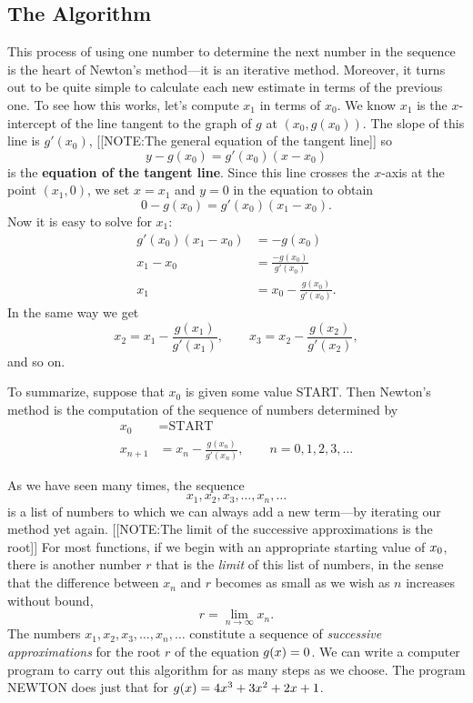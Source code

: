 \subsection{The Algorithm}
\label{subsec:the-algorithm}

This process of using one number to determine the next number in the
sequence is the heart of Newton's method---it is an iterative method.
Moreover, it turns out to be quite simple to calculate each new
estimate in terms of the previous one.  To see how this works, let's
compute $x_{1}$ in terms of $x_{0}$.  We know $x_{1}$ is the
$x$-intercept of the line tangent to the graph of $g$ at $(x_{0},
g(x_{0}))$.  The slope of this line is $g'(x_{0})$,
[[NOTE:The general equation of the tangent line]] 
so 
	\[
y - g(x_{0}) = g'(x_{0})(x - x_{0})
\] 
is the {\bf equation of the tangent line}.  Since this line crosses the $x$-axis at the point  $(x_{1},0)$,  we set  $x = x_{1}$  and  $y = 0$  in the equation to obtain
	\[
0 - g(x_{0}) = g'(x_{0})(x_{1} - x_{0}).
\]
Now it is easy to solve for  $x_{1}$:
\begin{align*}
     g'(x_{0})(x_{1} - x_{0}) &= -g(x_{0}) \\
                x_{1} - x_{0} &= \frac{-g(x_{0})}{g'(x_{0})}  \\
                        x_{1} &= x_{0} - \frac{g(x_{0})}{g'(x_{0})}.
\end{align*}
In the same way we get 
\[
x_{2} = x_{1} - \frac{g(x_{1})}{g'(x_{1})},  \qquad
x_{3} = x_{2} - \frac{g(x_{2})}{g'(x_{2})},       
\]
and so on.

To summarize, suppose that $x_{0}$ is given some value START.  Then
Newton's method is the computation of the
sequence of numbers determined by
\begin{align*}
             x_{0} &= \mbox{START}    \\
           x_{n+1} &= x_{n} - \frac{g(x_{n})}{g'(x_{n})}, 
               \qquad n = 0,1,2,3,\ldots
\end{align*}

	As we have seen many times, the sequence
\[
x_1, x_2, x_3, \ldots, x_n, \ldots
\]
is a list of numbers to which we can always add a new term---by iterating our method yet again.  
	[[NOTE:The limit of  the successive approximations  is the root]]
For most functions, if we begin with an appropriate starting value of $x_0\/$, there is another number $r$ that is the {\em limit\/} of this list of numbers, in the sense that the difference between $x_n$ and $r$ becomes as small as we wish as $n$ increases without bound,
	\[
r= \lim_{n \rightarrow \infty} x_n.
\]
The numbers $x_1, x_2, x_3, \ldots, x_n, \ldots$ constitute a sequence of
{\em successive approximations\/} for the root $r$ of the equation $g(x)=0\/$.
We can write a computer program to carry out this algorithm for as many steps as we choose.  The program NEWTON does just that for 
$g(x) = 4x^3 + 3x^2 +2x +1\/$.

